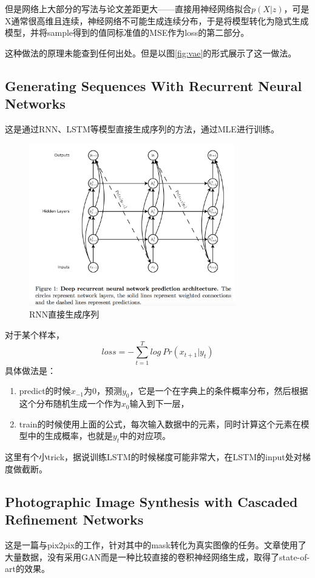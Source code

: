 \documentclass[a4paper]{article}
\begin{document}
但是网络上大部分的写法与论文差距更大——直接用神经网络拟合$p(X|z)$，可是X通常很高维且连续，神经网络不可能生成连续分布，于是将模型转化为隐式生成模型，并将sample得到的值同标准值的MSE作为loss的第二部分。

这种做法的原理未能查到任何出处。但是\citep{vae_toturial}以图\ref{fig:vae}的形式展示了这一做法。
\subsection{Generating Sequences With Recurrent Neural Networks\cite{DBLP:journals/corr/Graves13}}
这是通过RNN、LSTM等模型直接生成序列的方法，通过MLE进行训练。
\begin{figure}
\centering
\includegraphics[width=0.8\textwidth]{./img/3.png}
\caption{RNN直接生成序列}
\label{fig:rnn}
\end{figure}
对于某个样本，$$loss = -\sum\limits_{t=1}^{T} log \ Pr(x_{t+1}|y_t)$$
具体做法是：
\begin{enumerate}
\item predict的时候$x_{-1}$为0，预测$y_0$，它是一个在字典上的条件概率分布，然后根据这个分布随机生成一个作为$x_0$输入到下一层，
\item train的时候使用上面的公式，每次输入数据中的元素，同时计算这个元素在模型中的生成概率，也就是$y_t$中的对应项。
\end{enumerate}
这里有个小trick，据说训练LSTM的时候梯度可能非常大，在LSTM的input处对梯度做截断。
\subsection{Photographic Image Synthesis with Cascaded Refinement Networks\cite{chen2017photographic}}
这是一篇与pix2pix的工作，针对其中的mask转化为真实图像的任务。文章使用了大量数据，没有采用GAN而是一种比较直接的卷积神经网络生成，取得了state-of-art的效果。
\end{document}
